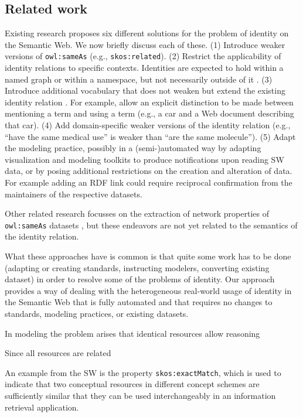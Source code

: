 \subsection{Related work}
\label{sec:related_work}

Existing research proposes six different solutions for
the problem of identity on the Semantic Web.
We now briefly discuss each of these.
(1) Introduce weaker versions of \verb|owl:sameAs|
  \cite{halpin_hayes_2010,mccusker_mcguinness_2010}
  (e.g., \verb|skos:related|).
(2) Restrict the applicability of identity relations to specific contexts.
  Identities are expected to hold within a named graph or within a namespace,
  but not necessarily outside of it \cite{halpin_hayes_2010,melo_2013}.
(3) Introduce additional vocabulary that does not weaken but extend
  the existing identity relation \cite{halpin_hayes_2010}.
  For example, allow an explicit distinction to be made between mentioning
  a term and using a term
  (e.g., a car and a Web document describing that car).
(4) Add domain-specific weaker versions of the identity relation
  \cite{mccusker_mcguinness_2010} (e.g., ``have the same medical use''
  is weaker than ``are the same molecule'').
(5) Adapt the modeling practice, possibly in a (semi-)automated way
  by adapting visualization and modeling toolkits to produce notifications
  upon reading SW data, or by posing additional restrictions on the creation
  and alteration of data. For example adding an RDF link could require
  reciprocal confirmation from the maintainers of the respective datasets.
  \cite{halpin_hayes_2010,ding_shinavier_finin_mcguinness_2010}

Other related research focusses on the extraction of network properties of
  \verb|owl:sameAs| datasets \cite{ding_shinavier_shangguan_mcguinness_2010},
  but these endeavors are not yet related to the semantics of the
  identity relation.

What these approaches have is common is that quite some work has to be done
  (adapting or creating standards, instructing modelers, converting existing
  dataset) in order to resolve some of the problems of identity.
Our approach provides a way of dealing with the heterogeneous real-world usage
  of identity in the Semantic Web that is fully automated and that requires
  no changes to standards, modeling practices, or existing datasets.

In modeling the problem arises that identical resources allow reasoning

Since all resources are related

An example from the SW is the property \verb|skos:exactMatch|,
which is used to indicate that two conceptual resources in
different concept schemes are sufficiently similar that
they can be used interchangeably
in an information retrieval application.
